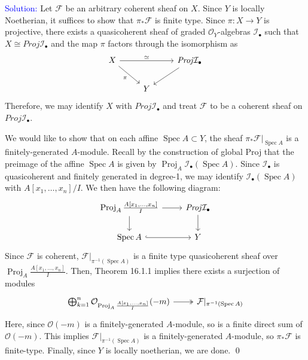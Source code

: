\documentclass[11pt]{article}
\newcommand{\cF}{\mathcal{F}}
\newcommand{\cI}{\mathcal{I}}
\newcommand{\cO}{\mathcal{O}}
\DeclareMathOperator{\Spec}{\operatorname{Spec}}
\newcommand{\Proj}{\operatorname{Proj}}
\newcommand{\PROJ}{\mathit{Proj}}
\newenvironment{solution}{\begin{trivlist}\item[]{\textcolor{blue}{Solution:}}}{\qed \end{trivlist}}
\begin{document}
\begin{solution}
    Let $\cF$ be an arbitrary coherent sheaf on $X$. Since $Y$ is locally Noetherian, it suffices to show that $\pi_* \cF$ is finite type. Since $\pi: X \rightarrow Y$ is projective, there exists a quasicoherent sheaf of graded $\cO_Y$-algebras $\cI_{\bullet}$ such that $X \cong \PROJ \cI_{\bullet}$ and the map $\pi$ factors through the isomorphism as 
    \[\begin{tikzcd}
        X && {\PROJ \cI_{\bullet}} \\
        & Y
        \arrow["\simeq", from=1-1, to=1-3]
        \arrow["\pi"', from=1-1, to=2-2]
        \arrow[from=1-3, to=2-2]
    \end{tikzcd}\]
    Therefore, we may identify $X$ with $\PROJ \cI_{\bullet}$ and treat $\cF$ to be a coherent sheaf on $\PROJ \cI_{\bullet}$.

    We would like to show that on each affine $\Spec A \subset Y$, the sheaf $\pi_* \cF|_{\Spec A}$ is a finitely-generated $A$-module. Recall by the construction of global Proj that the preimage of the affine $\Spec A$ is given by $\Proj_A \cI_{\bullet}(\Spec A)$. Since $\cI_{\bullet}$ is quasicoherent and finitely generated in degree-1, we may identify $\cI_{\bullet}(\Spec A)$ with $A[x_1, \ldots, x_n] / I$. We then have the following diagram:
    \[\begin{tikzcd}
        {\Proj_A \frac{A[x_1, \ldots, x_n]}{I}} & {\PROJ \cI_{\bullet}} \\
        {\Spec A} & Y
        \arrow[from=1-1, to=1-2]
        \arrow[from=1-1, to=2-1]
        \arrow[from=1-2, to=2-2]
        \arrow[hook, from=2-1, to=2-2]
    \end{tikzcd}\]
    Since $\cF$ is coherent, $\cF|_{\pi^{-1}(\Spec A)}$ is a finite type quasicoherent sheaf over $\Proj_A \frac{A[x_1, \ldots, x_n]}{I}$. Then, Theorem 16.1.1 implies there exists a surjection of modules 
    \[\begin{tikzcd}
        {\bigoplus_{k=1}^n \cO_{\Proj_A \frac{A[x_1, \ldots, x_n]}{I}}(-m) } & {\cF|_{\pi^{-1}(\Spec A)}}
        \arrow[two heads, from=1-1, to=1-2]
    \end{tikzcd}\]
    Here, since $\cO(-m)$ is a finitely-generated $A$-module, so is a finite direct sum of $\cO(-m)$. This implies $\cF|_{\pi^{-1}(\Spec A)}$ is a finitely-generated $A$-module, so $\pi_* \cF$ is finite-type. Finally, since $Y$ is locally noetherian, we are done.
\end{solution}
\end{document}
